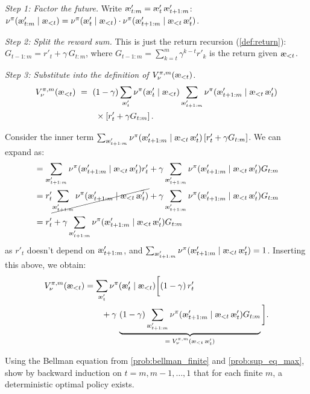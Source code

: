 \documentclass[fontsize=11pt, parskip=half]{scrartcl}
\newcommand{\aes}{\textnormal{\ae}}
\begin{document}
\begin{solution}
\emph{Step 1: Factor the future.}
Write $\aes'_{t:m} = \aes'_t\, \aes'_{t+1:m}$:
$\nu^\pi(\aes'_{t:m} \mid \aes_{<t}) = \nu^\pi(\aes'_t \mid \aes_{<t}) \cdot \nu^\pi(\aes'_{t+1:m} \mid \aes_{<t}\, \aes'_t)$.

\emph{Step 2: Split the reward sum.}
This is just the return recursion (\cref{def:return}): $G_{t-1:m} = r'_t + \gamma\, G_{t:m}$, where $G_{t-1:m} = \sum_{k=t}^{m} \gamma^{k-t} r'_k$ is the return given $\aes_{<t}$.

\emph{Step 3: Substitute into the definition of $V_\nu^{\pi,m}(\aes_{<t})$.}
\begin{align*}
    V_\nu^{\pi,m}(\aes_{<t})
    ~&=~ (1-\gamma) \sum_{\aes'_t} \nu^\pi(\aes'_t \mid \aes_{<t})
 \sum_{\aes'_{t+1:m}} \nu^\pi(\aes'_{t+1:m} \mid \aes_{<t}\, \aes'_t) \\
    &\qquad \times \left[ r'_t + \gamma G_{t:m} \right].
\end{align*}

Consider the inner term $\sum_{\aes'_{t+1:m}} \nu^\pi(\aes'_{t+1:m} \mid \aes_{<t}\, \aes'_t) 
\left[ r'_t + \gamma G_{t:m} \right]$. 
We can expand as:
\begin{align*}
&= \sum_{\aes'_{t+1:m}} \nu^\pi(\aes'_{t+1:m} \mid \aes_{<t}\, \aes'_t) r'_t 
+ \gamma \sum_{\aes'_{t+1:m}} \nu^\pi(\aes'_{t+1:m} \mid \aes_{<t}\, \aes'_t) G_{t:m} \\
&= r'_t \cancel{\sum_{\aes'_{t+1:m}} \nu^\pi(\aes'_{t+1:m} \mid \aes_{<t}\, \aes'_t)}  
+ \gamma \sum_{\aes'_{t+1:m}} \nu^\pi(\aes'_{t+1:m} \mid \aes_{<t}\, \aes'_t) G_{t:m} \\
&= r'_t
+ \gamma \sum_{\aes'_{t+1:m}} \nu^\pi(\aes'_{t+1:m} \mid \aes_{<t}\, \aes'_t) G_{t:m}
\end{align*}
as $r'_t$ doesn't depend on $\aes'_{t+1:m}$, and $\sum_{\aes'_{t+1:m}} \nu^\pi(\aes'_{t+1:m} \mid \aes_{<t}\, \aes'_t) = 1$.
Inserting this above, we obtain:
\begin{align*}
    V_\nu^{\pi,m}(\aes_{<t})
    &= \sum_{\aes'_t} \nu^\pi(\aes'_t \mid \aes_{<t}) \bigg[ (1-\gamma)\, r'_t \\
    &\qquad +
    \gamma\, \underbrace{(1-\gamma) \sum_{\aes'_{t+1:m}} \nu^\pi(\aes'_{t+1:m} \mid \aes_{<t}\, \aes'_t)G_{t:m}}_{=\; V_\nu^{\pi,m}(\aes_{<t}\, \aes'_t)} \bigg].
\end{align*}
\end{solution}

\begin{exercise}
\label{prob:backward_induction}
\skippable
Using the Bellman equation from \cref{prob:bellman_finite} and \cref{prob:sup_eq_max}, show by backward induction on $t = m, m-1, \ldots, 1$ that for each finite $m$, a deterministic optimal policy exists.

\end{exercise}
\end{document}
